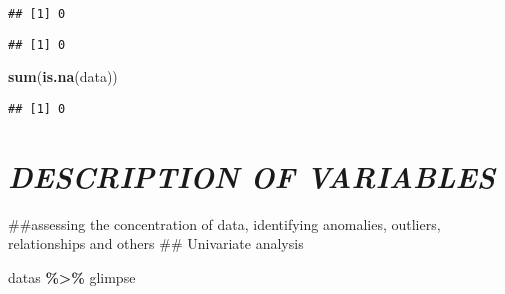 \documentclass[
]{article}
\newenvironment{Shaded}{\begin{snugshade}}{\end{snugshade}}
\newcommand{\CommentTok}[1]{\textcolor[rgb]{0.56,0.35,0.01}{\textit{#1}}}
\newcommand{\FunctionTok}[1]{\textcolor[rgb]{0.13,0.29,0.53}{\textbf{#1}}}
\newcommand{\NormalTok}[1]{#1}
\newcommand{\SpecialCharTok}[1]{\textcolor[rgb]{0.81,0.36,0.00}{\textbf{#1}}}
\begin{document}
\begin{Shaded}
\end{Shaded}

\begin{verbatim}
## [1] 0
\end{verbatim}

\begin{Shaded}
\end{Shaded}

\begin{verbatim}
## [1] 0
\end{verbatim}

\begin{Shaded}
\begin{Highlighting}[]
\FunctionTok{sum}\NormalTok{(}\FunctionTok{is.na}\NormalTok{(data))}
\end{Highlighting}
\end{Shaded}

\begin{verbatim}
## [1] 0
\end{verbatim}

\section{\texorpdfstring{\textbf{\emph{DESCRIPTION OF
VARIABLES}}}{DESCRIPTION OF VARIABLES}}\label{description-of-variables}

\#\#assessing the concentration of data, identifying anomalies,
outliers, relationships and others \#\# Univariate analysis

\begin{Shaded}
\begin{Highlighting}[]
\NormalTok{datas }\SpecialCharTok{\%\textgreater{}\%}\NormalTok{ glimpse}
\end{Highlighting}
\end{Shaded}
\end{document}
